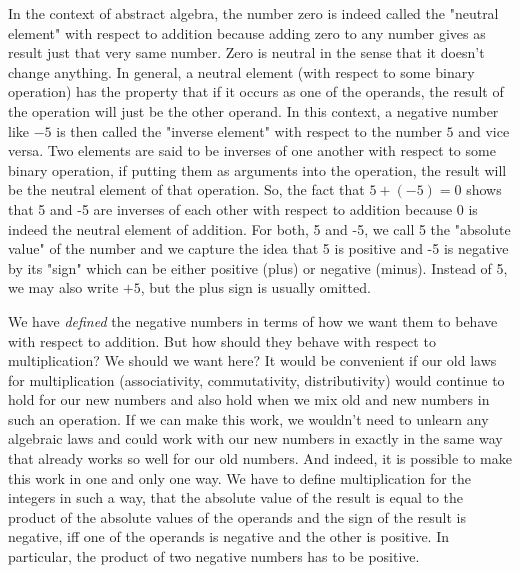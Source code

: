 \medskip
In the context of abstract algebra, the number zero is indeed called the "neutral element" with respect to addition because adding zero to any number gives as result just that very same number. Zero is neutral in the sense that it doesn't change anything. In general, a neutral element (with respect to some binary operation) has the property that if it occurs as one of the operands, the result of the operation will just be the other operand. In this context, a negative number like $-5$ is then called the "inverse element" with respect to the number $5$ and vice versa. Two elements are said to be inverses of one another with respect to some binary operation, if putting them as arguments into the operation, the result will be the neutral element of that operation. So, the fact that $5 + (-5) = 0$ shows that 5 and -5 are inverses of each other with respect to addition because 0 is indeed the neutral element of addition. For both, 5 and -5, we call 5 the "absolute value" of the number and we capture the idea that 5 is positive and -5 is negative by its "sign" which can be either positive (plus) or negative (minus). Instead of 5, we may also write $+5$, but the plus sign is usually omitted.

\medskip
We have \emph{defined} the negative numbers in terms of how we want them to behave with respect to addition. But how should they behave with respect to multiplication? We should we want here? It would be convenient if our old laws for multiplication (associativity, commutativity, distributivity) would continue to hold for our new numbers and also hold when we mix old and new numbers in such an operation. If we can make this work, we wouldn't need to unlearn any algebraic laws and could work with our new numbers in exactly in the same way that already works so well for our old numbers. And indeed, it is possible to make this work in one and only one way. We have to define multiplication for the integers in such a way, that the absolute value of the result is equal to the product of the absolute values of the operands and the sign of the result is negative, iff one of the operands is negative and the other is positive. In particular, the product of two negative numbers has to be positive.


